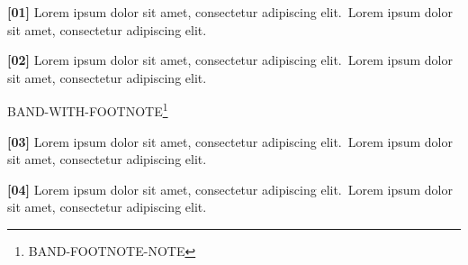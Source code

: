 \documentclass{article}
\newcommand\Body{Lorem ipsum dolor sit amet, consectetur adipiscing elit.}
\newcommand\Par[1]{\par\textbf{[#1]} \Body\ \Body\par\medskip}
\begin{document}
\Par{01}\Par{02}
\begin{wideband}
  \centering BAND-WITH-FOOTNOTE\footnote{BAND-FOOTNOTE-NOTE}
\end{wideband}
\Par{03}\Par{04}
\end{document}

